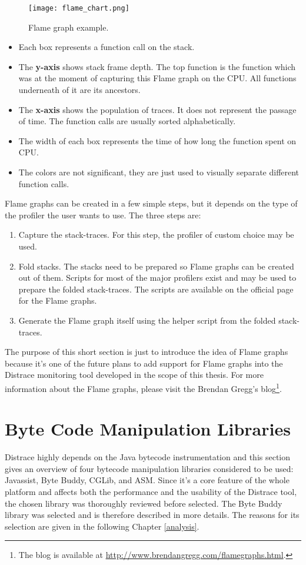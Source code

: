 \begin{figure}
	\centering
	\texttt{[image: flame\_chart.png]}
	\caption{Flame graph example.}
	\label{fig:flame_chart}
\end{figure}

\begin{itemize}
	\item Each box represents a function call on the stack.
	\item The \textbf{y-axis} shows stack frame depth. The top function is the function which was at the moment of capturing this Flame graph on the CPU. All functions underneath of it are its ancestors.
	\item The \textbf{x-axis} shows the population of traces. It does not represent the passage of time. The function calls are usually sorted alphabetically.
	\item The width of each box represents the time of how long the function spent on CPU.
	\item The colors are not significant, they are just used to visually separate different function calls.
\end{itemize}

Flame graphs can be created in a few simple steps, but it depends on the type of the profiler the user wants to use. The three steps are:
\begin{enumerate}
	\item Capture the stack-traces. For this step, the profiler of custom choice may be used.
	\item Fold stacks. The stacks need to be prepared so Flame graphs can be created out of them. Scripts for most of the major profilers exist and may be used to prepare the folded stack-traces. The scripts are available on the official page for the Flame graphs.
	\item Generate the Flame graph itself using the helper script from the folded stack-traces.
\end{enumerate}

The purpose of this short section is just to introduce the idea of Flame graphs because it's one of the future plans to add support for Flame graphs into the Distrace monitoring tool developed in the scope of this thesis. For more information about the Flame graphs, please visit the Brendan Gregg's blog\footnote{The blog is available at \url{http://www.brendangregg.com/flamegraphs.html}.}.
\section{Byte Code Manipulation Libraries}
Distrace highly depends on the Java bytecode instrumentation and this section gives an overview of four bytecode manipulation libraries considered to be used: Javassist, Byte Buddy, CGLib, and ASM. Since it's a core feature of the whole platform and affects both the performance and the usability of the Distrace tool, the chosen library was thoroughly reviewed before selected. The Byte Buddy library was selected and is therefore described in more details. The reasons for its selection are given in the following Chapter \ref{analysis}.

